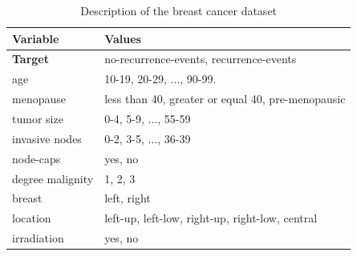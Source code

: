 \documentclass[10pt,a4paper,twoside]{book}
\begin{document}
\begin{table}[]
\centering
\caption{Description of the breast cancer dataset}
\label{breastcancer}
\begin{tabular}{@{}ll@{}}
\toprule
\textbf{Variable} & \textbf{Values}                                   \\ \midrule
\textbf{Target}   & no-recurrence-events, recurrence-events           \\
age               & 10-19, 20-29, $\dots$, 90-99.                         \\
menopause         & less than 40, greater or equal 40, pre-menopausic \\
tumor size        & 0-4, 5-9, $\dots$, 55-59                              \\
invasive nodes    & 0-2, 3-5, $\dots$, 36-39                              \\
node-caps         & yes, no                                           \\ 
degree malignity  & 1, 2, 3                                           \\
breast            & left, right                                       \\
location          & left-up, left-low, right-up, right-low, central   \\
irradiation       & yes, no\\
\midrule                                          
\end{tabular}
\end{table}
\end{document}
